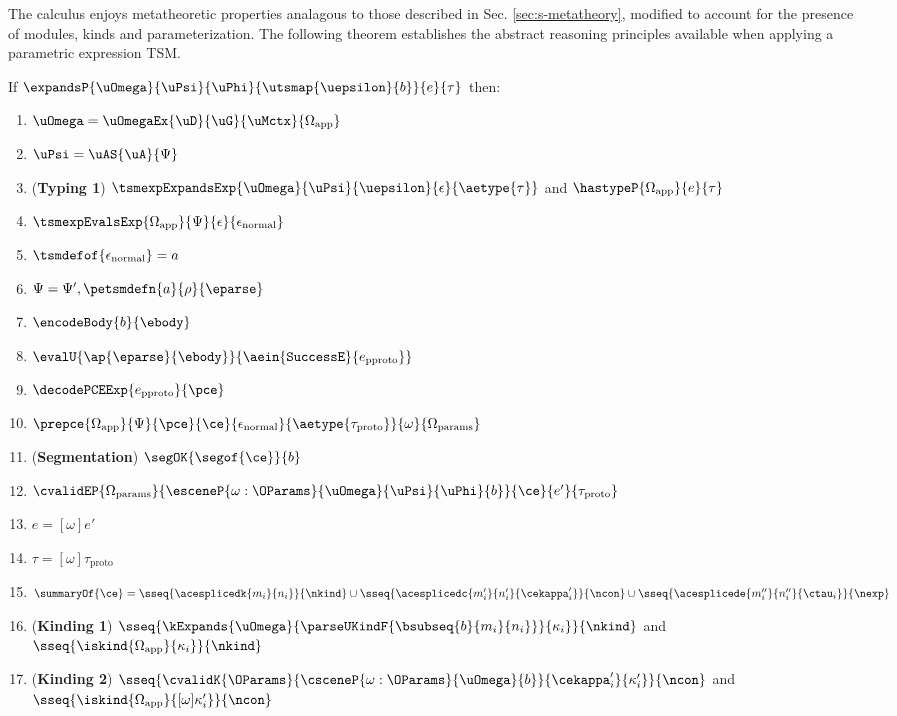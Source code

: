 \documentclass[acmlarge,review,anonymous]{acmart}\settopmatter{printfolios=true}
\begin{document}
The calculus enjoys metatheoretic properties analagous to those described in Sec. \ref{sec:s-metatheory}, modified to account for the presence of modules, kinds and parameterization. The following theorem establishes the abstract reasoning principles available when applying a parametric expression TSM.
\vspace{-3px}
\begin{theorem}
If $\expandsP{\uOmega}{\uPsi}{\uPhi}{\utsmap{\uepsilon}{b}}{e}{\tau}$ then:
\begin{enumerate}[nolistsep]
  \item $\uOmega=\uOmegaEx{\uD}{\uG}{\uMctx}{\Omega_\text{app}}$
  \item $\uPsi=\uAS{\uA}{\Psi}$
  \item (\textbf{Typing 1}) $\tsmexpExpandsExp{\uOmega}{\uPsi}{\uepsilon}{\epsilon}{\aetype{\tau}}$ and $\hastypeP{\Omega_\text{app}}{e}{\tau}$
  \item $\tsmexpEvalsExp{\Omega_\text{app}}{\Psi}{\epsilon}{\epsilon_\text{normal}}$
  \item $\tsmdefof{\epsilon_\text{normal}}=a$
  \item $\Psi = \Psi', \petsmdefn{a}{\rho}{\eparse}$
  \item $\encodeBody{b}{\ebody}$
    \item $\evalU{\ap{\eparse}{\ebody}}{\aein{\mathtt{SuccessE}}{e_\text{pproto}}}$
  \item $\decodePCEExp{e_\text{pproto}}{\pce}$
  \item $\prepce{\Omega_\text{app}}{\Psi}{\pce}{\ce}{\epsilon_\text{normal}}{\aetype{\tau_\text{proto}}}{\omega}{\Omega_\text{params}}$
  \item (\textbf{Segmentation}) $\segOK{\segof{\ce}}{b}$
  \item $\cvalidEP{\Omega_\text{params}}{\esceneP{\omega : \OParams}{\uOmega}{\uPsi}{\uPhi}{b}}{\ce}{e'}{\tau_\text{proto}}$
  \item $e = [\omega]e'$
  \item $\tau = [\omega]\tau_\text{proto}$
  \item $
    \summaryOf{\ce} = \sseq{\acesplicedk{m_i}{n_i}}{\nkind} \cup \sseq{\acesplicedc{m'_i}{n'_i}{\cekappa'_i}}{\ncon} \cup 
               \sseq{\acesplicede{m''_i}{n''_i}{\ctau_i}}{\nexp}
    $
  \item (\textbf{Kinding 1}) $\sseq{\kExpands{\uOmega}{\parseUKindF{\bsubseq{b}{m_i}{n_i}}}{\kappa_i}}{\nkind}$ and $\sseq{\iskind{\Omega_\text{app}}{\kappa_i}}{\nkind}$
  \item (\textbf{Kinding 2}) $\sseq{\cvalidK{\OParams}{\csceneP{\omega : \OParams}{\uOmega}{b}}{\cekappa'_i}{\kappa'_i}}{\ncon}$ and $\sseq{\iskind{\Omega_\text{app}}{[\omega]\kappa'_i}}{\ncon}$

\end{enumerate}
\end{theorem}
\end{document}
